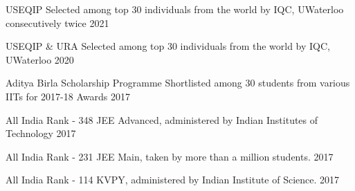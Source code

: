 
\begin{cvhonors}

  \cvhonor
    {USEQIP} %
    {Selected among top 30 individuals from the world by IQC, UWaterloo consecutively twice} %
    {} %
    {2021} %
    
  \cvhonor
    {USEQIP \& URA} %
    {Selected among top 30 individuals from the world by IQC, UWaterloo} %
    {} %
    {2020} %

  \cvhonor
    {Aditya Birla Scholarship Programme} %
    {Shortlisted among 30 students from various IITs for 2017-18 Awards} %
    {} %
    {2017} %

  \cvhonor
    {All India Rank - 348} %
    {JEE Advanced, administered by Indian Institutes of Technology} %
    {} %
    {2017} %
    
  \cvhonor
    {All India Rank - 231} %
    {JEE Main, taken by more than a million students.} %
    {} %
    {2017} %

  \cvhonor
    {All India Rank - 114} %
    {KVPY, administered by Indian Institute of Science.} %
    {} %
    {2017} %

\end{cvhonors}